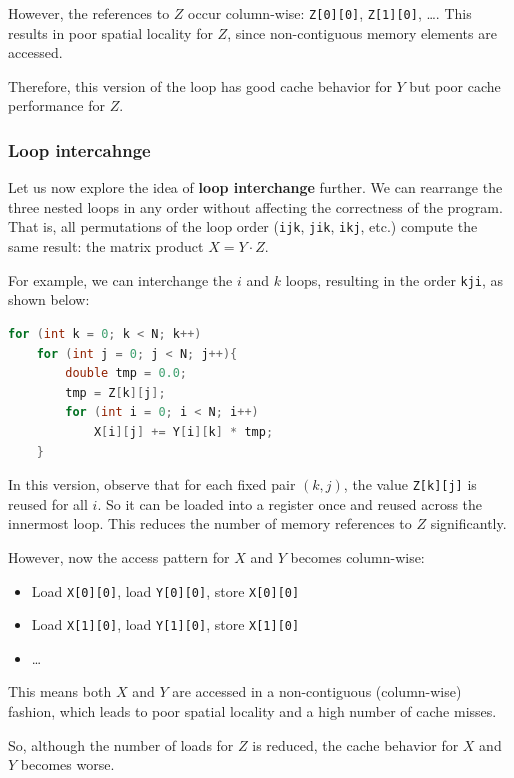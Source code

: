 \documentclass[12pt]{book}
\begin{document}
However, the references to $Z$ occur column-wise: \texttt{Z[0][0]}, \texttt{Z[1][0]}, \dots. This results in poor spatial locality for $Z$, since non-contiguous memory elements are accessed. 

Therefore, this version of the loop has good cache behavior for $Y$ but poor cache performance for $Z$.

\subsubsection*{Loop intercahnge}
Let us now explore the idea of \textbf{loop interchange} further. We can rearrange the three nested loops in any order without affecting the correctness of the program. That is, all permutations of the loop order (\texttt{ijk}, \texttt{jik}, \texttt{ikj}, etc.) compute the same result: the matrix product $X = Y \cdot Z$.

For example, we can interchange the $i$ and $k$ loops, resulting in the order \texttt{kji}, as shown below:

\begin{lstlisting}[language=C++, caption={Matrix multiplication with loop order kji}, label={lst:kji-matmul}]
for (int k = 0; k < N; k++)
    for (int j = 0; j < N; j++){
        double tmp = 0.0;
        tmp = Z[k][j];
        for (int i = 0; i < N; i++)
            X[i][j] += Y[i][k] * tmp;
    }
\end{lstlisting}

In this version, observe that for each fixed pair $(k, j)$, the value \texttt{Z[k][j]} is reused for all $i$. So it can be loaded into a register once and reused across the innermost loop. This reduces the number of memory references to $Z$ significantly.

However, now the access pattern for $X$ and $Y$ becomes column-wise:
\begin{itemize}
    \item Load \texttt{X[0][0]}, load \texttt{Y[0][0]}, store \texttt{X[0][0]}
    \item Load \texttt{X[1][0]}, load \texttt{Y[1][0]}, store \texttt{X[1][0]}
    \item \dots
\end{itemize}

This means both $X$ and $Y$ are accessed in a non-contiguous (column-wise) fashion, which leads to poor spatial locality and a high number of cache misses.

So, although the number of loads for $Z$ is reduced, the cache behavior for $X$ and $Y$ becomes worse.
\end{document}
